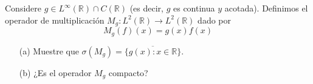  Considere $g \in L^{\infty}(\mathbb{R}) \cap C(\mathbb{R})$ (es decir, $g$ es continua $y$ acotada). Definimos el operador de multiplicación $M_g: L^2(\mathbb{R}) \rightarrow L^2(\mathbb{R})$ dado por
$$
M_g(f)(x)=g(x) f(x)
$$
\begin{itemize}
    \item[(a)] Muestre que $\sigma\left(M_g\right)=\overline{\{g(x): x \in \mathbb{R}\}}$.
\item[(b)] ¿Es el operador $M_g$ compacto? 
\end{itemize}
